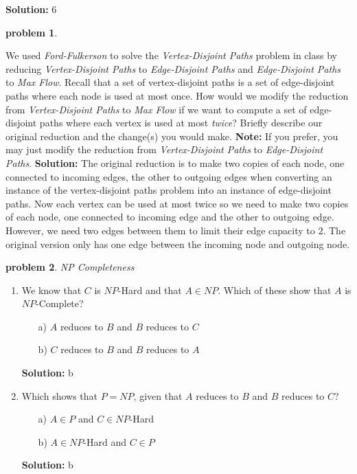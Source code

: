 \documentclass[10pt]{article}
\newcommand{\solution}[1]{\color{blue}\hfill\break\noindent\textbf{Solution:} #1\color{black}}
\newtheorem{problem}{\sc\color{cit}problem}
\begin{document}
\solution{
6
}
  
 
\begin{problem}\end{problem}
We used \emph{Ford-Fulkerson} to solve the \emph{Vertex-Disjoint Paths} problem in class by reducing
\emph{Vertex-Disjoint Paths} to \emph{Edge-Disjoint Paths} and 
\emph{Edge-Disjoint Paths} to \emph{Max Flow}. Recall that a set of vertex-disjoint paths is
a set of edge-disjoint paths where each node is used at most once. How would we modify the reduction from \emph{Vertex-Disjoint Paths} to \emph{Max Flow} if we want to compute a set of edge-disjoint paths where each vertex is used at most {\em twice}? Briefly describe our original reduction and the change(s) you would make. {\bf Note:} If you prefer, you may just modify the reduction from \emph{Vertex-Disjoint Paths} to \emph{Edge-Disjoint Paths}.
\solution{
    The original reduction is to make two copies of each node, one connected to incoming edges, the other to outgoing edges when converting an instance of the vertex-disjoint paths problem into an instance of edge-disjoint paths. Now each vertex can be used at most twice so we need to make two copies of each node, one connected to incoming edge and the other to outgoing edge. However, we need two edges between them to limit their edge capacity to $2$. The original version only has one edge between the incoming node and outgoing node.
}


\begin{problem}NP Completeness\end{problem}
\begin{enumerate}
    \item We know that $C$ is $NP$-Hard and that $A \in NP$.  Which of these show that $A$ is $NP$-Complete?
    \begin{itemize}
        \item[a)] $A$ reduces to $B$ and $B$ reduces to $C$
        \item[b)] $C$ reduces to $B$ and $B$ reduces to $A$
    \end{itemize}
    \solution{
    b
    }

    
    \item Which shows that $P = NP$, given that $A$ reduces to $B$ and $B$ reduces to $C$?
    \begin{itemize}
        \item[a)] $A \in P$ and $C \in NP$-Hard
        \item[b)] $A \in NP$-Hard and $C \in P$
    \end{itemize}
    \solution{
    b
    }

\end{enumerate}
\end{document}
